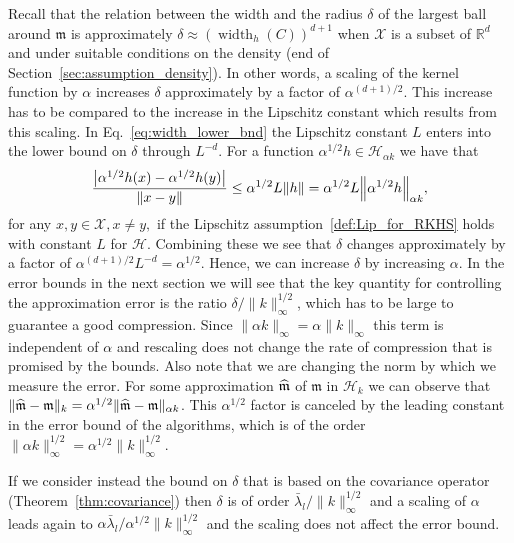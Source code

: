 \documentclass[10pt]{amsart}
\theoremstyle{definition}\newtheorem{defi}[theo]{Definition}\newtheorem{rema}[theo]{Remark}\newtheorem{exam}[theo]{Example}\newtheorem{exem}[theo]{Example}\newtheorem{nota}[theo]{Notation}
\theoremstyle{remark}
\DeclareMathOperator{\diam}{width}
\newcommand{\R}{\mathbb{R}}
\newcommand{\X}{\mathcal{X}}
\newcommand{\cH}{\mathcal{H}}
\newcommand{\mean}{\mathfrak{m}}
\let\oldhat\hat
\renewcommand*{\hat}[1]{\mathchoice{\widehat{#1}}{\widehat{#1}}{\oldhat{#1}}{\oldhat{#1}}}
\let\originalleft\left
\let\originalright\right
\renewcommand{\left}{\mathopen{}\mathclose\bgroup\originalleft}
\renewcommand{\right}{\aftergroup\egroup\originalright}
\begin{document}
Recall that the relation between the width and the radius $\delta$ of the largest ball around $\mean$ is approximately $\delta \approx (\diam_h(C))^{d+1}$ when $\X$ is a subset of $\R^d$ and under suitable conditions on the density (end of Section~\ref{sec:assumption_density}). In other words, a scaling of the kernel function by $\alpha$ increases $\delta$ approximately by a factor of $\alpha^{(d+1)/2}$. This increase has to be compared to the increase in the Lipschitz constant which results from this scaling. In Eq.~\eqref{eq:width_lower_bnd} the Lipschitz constant $L$ enters into the lower bound on $\delta$ through $L^{-d}$. For a function $\alpha^{1/2} h \in \cH_{\alpha k}$ we have that
\[
\frac{\left|\alpha^{1/2} h(x) - \alpha^{1/2} h(y)\right|}{\|x-y\|} \leq \alpha^{1/2} L \|h\| = \alpha^{1/2} L \left\|\alpha^{1/2} h\right\|_{\alpha k},
\]
for any $x,y \in \X, x \not = y,$ if the Lipschitz assumption~\eqref{def:Lip_for_RKHS} holds with constant $L$ for $\cH$. Combining these we see that $\delta$ changes approximately by a factor of $\alpha^{(d+1)/2} L^{-d} = \alpha^{1/2}$. Hence, we can increase $\delta$ by increasing $\alpha$. In the error bounds in the next section we will see that the key quantity for controlling the approximation error is the ratio $\delta/\|k\|^{1/2}_\infty$, which has to be large to guarantee a good compression. Since $\|\alpha k\|_\infty = \alpha \|k\|_\infty$ this term is independent of $\alpha$ and rescaling does not change the rate of compression that is promised by the bounds. Also note that we are changing the norm by which we measure the error. For some approximation $\hat \mean$ of $\mean$ in $\cH_k$ we can observe that $\|\hat \mean - \mean\|_k = \alpha^{1/2} \| \hat \mean - \mean \|_{\alpha k}$. This $\alpha^{1/2}$ factor is canceled by the leading constant in the error bound of the algorithms, which is of the order $\|\alpha k\|_\infty^{1/2} = \alpha^{1/2} \|k\|^{1/2}_\infty$.

If we consider instead the bound on $\delta$ that is based on the covariance operator (Theorem~\ref{thm:covariance}) then $\delta$ is of order $\bar \lambda_l/\|k\|_\infty^{1/2}$ and a scaling of $\alpha$ leads again to $\alpha \bar \lambda_l / \alpha^{1/2} \|k\|_\infty^{1/2}$ and the scaling does not affect the error bound.
\end{document}

